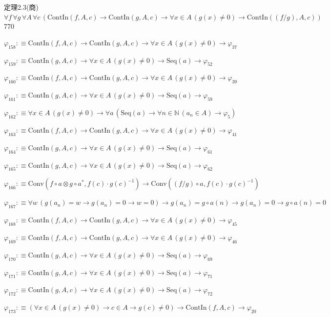 \begin{fullproof}{定理2.3(商)}{$\forall f\,\forall g\,\forall A\,\forall c\,(\mathrm{ContIn}(f,A,c) \to \mathrm{ContIn}(g,A,c) \to \forall x \in A\,(g(x) \neq 0) \to \mathrm{ContIn}((f / g),A,c))$}{770}
\begin{abbrevlist}
\item $\varphi_{158} :\equiv \mathrm{ContIn}(f,A,c) \to \mathrm{ContIn}(g,A,c) \to \forall x \in A\,(g(x) \neq 0) \to \varphi_{37}$
\item $\varphi_{159} :\equiv \mathrm{ContIn}(g,A,c) \to \forall x \in A\,(g(x) \neq 0) \to \mathrm{Seq}(a) \to \varphi_{52}$
\item $\varphi_{160} :\equiv \mathrm{ContIn}(f,A,c) \to \mathrm{ContIn}(g,A,c) \to \forall x \in A\,(g(x) \neq 0) \to \varphi_{39}$
\item $\varphi_{161} :\equiv \mathrm{ContIn}(g,A,c) \to \forall x \in A\,(g(x) \neq 0) \to \mathrm{Seq}(a) \to \varphi_{59}$
\item $\varphi_{162} :\equiv \forall x \in A\,(g(x) \neq 0) \to \forall a\,(\mathrm{Seq}(a) \to \forall n \in \mathbb{N}\,(a_{n} \in A) \to \varphi_{5})$
\item $\varphi_{163} :\equiv \mathrm{ContIn}(f,A,c) \to \mathrm{ContIn}(g,A,c) \to \forall x \in A\,(g(x) \neq 0) \to \varphi_{41}$
\item $\varphi_{164} :\equiv \mathrm{ContIn}(g,A,c) \to \forall x \in A\,(g(x) \neq 0) \to \mathrm{Seq}(a) \to \varphi_{61}$
\item $\varphi_{165} :\equiv \mathrm{ContIn}(g,A,c) \to \forall x \in A\,(g(x) \neq 0) \to \mathrm{Seq}(a) \to \varphi_{62}$
\item $\varphi_{166} :\equiv \mathrm{Conv}(f \circ a \otimes g \circ a^{\ast},f(c) \cdot g(c)^{-1}) \to \mathrm{Conv}((f / g) \circ a,f(c) \cdot g(c)^{-1})$
\item $\varphi_{167} :\equiv \forall w\,(g(a_{n}) = w \to g(a_{n}) = 0 \to w = 0) \to g(a_{n}) = g \circ a(n) \to g(a_{n}) = 0 \to g \circ a(n) = 0$
\item $\varphi_{168} :\equiv \mathrm{ContIn}(f,A,c) \to \mathrm{ContIn}(g,A,c) \to \forall x \in A\,(g(x) \neq 0) \to \varphi_{45}$
\item $\varphi_{169} :\equiv \mathrm{ContIn}(f,A,c) \to \mathrm{ContIn}(g,A,c) \to \forall x \in A\,(g(x) \neq 0) \to \varphi_{46}$
\item $\varphi_{170} :\equiv \mathrm{ContIn}(g,A,c) \to \forall x \in A\,(g(x) \neq 0) \to \mathrm{Seq}(a) \to \varphi_{69}$
\item $\varphi_{171} :\equiv \mathrm{ContIn}(g,A,c) \to \forall x \in A\,(g(x) \neq 0) \to \mathrm{Seq}(a) \to \varphi_{71}$
\item $\varphi_{172} :\equiv \mathrm{ContIn}(g,A,c) \to \forall x \in A\,(g(x) \neq 0) \to \mathrm{Seq}(a) \to \varphi_{72}$
\item $\varphi_{173} :\equiv (\forall x \in A\,(g(x) \neq 0) \to c \in A \to g(c) \neq 0) \to \mathrm{ContIn}(f,A,c) \to \varphi_{20}$

\end{abbrevlist}
\end{fullproof}
